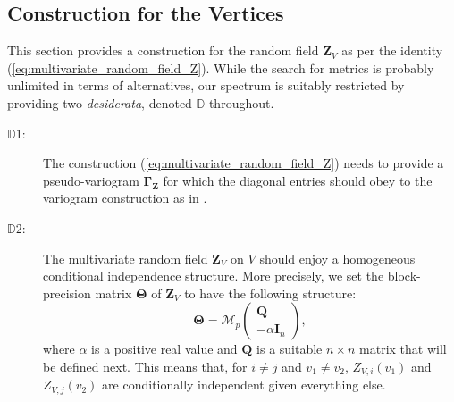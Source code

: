 \documentclass[12pt]{article}
\theoremstyle{plain}
\theoremstyle{remark}
\newcommand{\round}[1]{\left( #1 \right)}
\newcommand{\Mv}[3]{\mathcal{M}_{#1}\begin{pmatrix}
	#2\\
	#3
\end{pmatrix}}
\newcommand{\Mh}[3]{\mathcal{M}_{#1}\round{#2,#3}}
\newcommand{\onepp}[0]{{\mathbf{1}_{p\times p}}}
\newcommand{\latMatr}[1]{\mathbf{#1}}          %
\newcommand{\grMatr}[1]{{\boldsymbol{#1}}}   %
\newcommand{\rVec}[1]{{\bm{#1}}}            %
\begin{document}

\subsection{Construction for the Vertices} 
    \label{ssec:constructionZ_V}
    This section provides a construction for the random field $\rVec{Z}_V$ as per the identity (\ref{eq:multivariate_random_field_Z}). While the search for metrics is probably unlimited in terms of alternatives, our spectrum is suitably restricted by providing two \emph{desiderata}, denoted $\mathbb{D}$ throughout.
    \begin{description}
        \item[$\mathbb{D}1$:] The construction (\ref{eq:multivariate_random_field_Z}) needs to provide a pseudo-variogram $\grMatr \Gamma_{\rVec{Z}}$ for which the diagonal entries should obey to the variogram construction as in \cite{anderes_isotropic_2020}. 
        \item[$\mathbb{D}2$:] The multivariate  {random field} $\rVec{Z}_V$ on $V$ should enjoy a homogeneous conditional independence structure. More precisely, we set the block-precision matrix ${\grMatr{\Theta}}$ of $\rVec{Z}_V$ to have the following structure:
        \begin{equation}
            \label{eq:defTheta}
            {\grMatr{\Theta}} = \Mv{p}{\latMatr{Q}}{-\alpha {\latMatr{I}_n}},
        \end{equation}
        where $\alpha$ is a positive real value and $\latMatr{Q}$ is a suitable $n\times n$ matrix that will be defined next. This means that, for $i\ne j$ and $v_1\ne v_2$, ${Z}_{V,i}(v_1)$ and $Z_{V,j}(v_2)$ are conditionally independent given everything else.
    \end{description}
    
\end{document}
